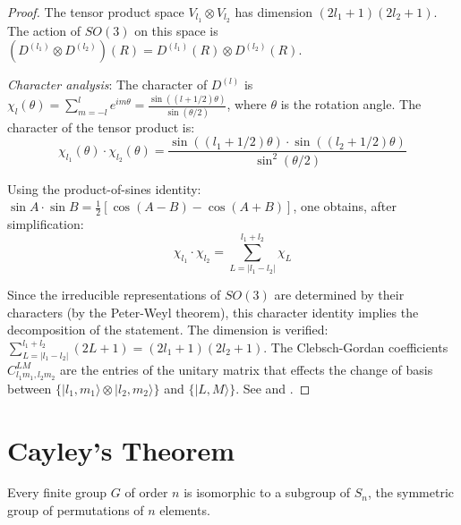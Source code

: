 \begin{proof}
The tensor product space $V_{l_1} \otimes V_{l_2}$ has dimension $(2l_1+1)(2l_2+1)$. The action of $SO(3)$ on this space is $(D^{(l_1)} \otimes D^{(l_2)})(R) = D^{(l_1)}(R) \otimes D^{(l_2)}(R)$.

\textit{Character analysis}: The character of $D^{(l)}$ is $\chi_l(\theta) = \sum_{m=-l}^{l} e^{im\theta} = \frac{\sin((l+1/2)\theta)}{\sin(\theta/2)}$, where $\theta$ is the rotation angle. The character of the tensor product is:
\[
\chi_{l_1}(\theta) \cdot \chi_{l_2}(\theta) = \frac{\sin((l_1+1/2)\theta) \cdot \sin((l_2+1/2)\theta)}{\sin^2(\theta/2)}
\]

Using the product-of-sines identity: $\sin A \cdot \sin B = \frac{1}{2}[\cos(A-B) - \cos(A+B)]$, one obtains, after simplification:
\[
\chi_{l_1} \cdot \chi_{l_2} = \sum_{L=|l_1-l_2|}^{l_1+l_2} \chi_L
\]

Since the irreducible representations of $SO(3)$ are determined by their characters (by the Peter-Weyl theorem), this character identity implies the decomposition of the statement. The dimension is verified: $\sum_{L=|l_1-l_2|}^{l_1+l_2}(2L+1) = (2l_1+1)(2l_2+1)$. The Clebsch-Gordan coefficients $C_{l_1 m_1, l_2 m_2}^{LM}$ are the entries of the unitary matrix that effects the change of basis between $\{|l_1, m_1\rangle \otimes |l_2, m_2\rangle\}$ and $\{|L, M\rangle\}$. See \citep[Chapter~8]{Serre1977} and \citep[Chapter~11]{Fulton1991}.
\end{proof}

\section{Cayley's Theorem}\label{sec:cayley}

\begin{theorem}\label{thm:cayley_apendice}
Every finite group $G$ of order $n$ is isomorphic to a subgroup of $S_n$, the symmetric group of permutations of $n$ elements.
\end{theorem}

